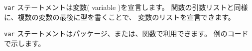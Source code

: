 \texttt{var} ステートメントは変数( variable )を宣言します。 
関数の引数リストと同様に、複数の変数の最後に型を書くことで、
変数のリストを宣言できます。

\texttt{var} ステートメントはパッケージ、または、関数で利用できます。
例のコードで示します。